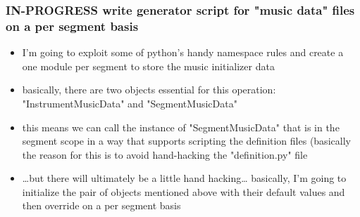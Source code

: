 \documentclass[11pt]{article}
\begin{document}
\subsubsection*{{\bfseries\sffamily IN-PROGRESS} write generator script for "music data" files on a per segment basis}
\label{sec:org8f52aaf}
\begin{itemize}
\item I'm going to exploit some of python's handy namespace rules and create a one module per segment to store the music initializer data
\item basically, there are two objects essential for this operation: "InstrumentMusicData" and "SegmentMusicData"
\item this means we can call the instance of "SegmentMusicData" that is in the segment scope in a way that supports scripting the definition files (basically the reason for this is to avoid hand-hacking the "definition.py" file
\item \ldots{}but there will ultimately be a little hand hacking\ldots{} basically, I'm going to initialize the pair of objects mentioned above with their default values and then override on a per segment basis
\end{itemize}
\end{document}
